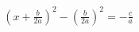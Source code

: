 \documentclass[preview]{standalone}
\begin{document}
\begin{align*}
(x+ \frac{b}{2a})^2 - (\frac{b}{2a})^2 = -\frac{c}{a}
\end{align*}
\end{document}
